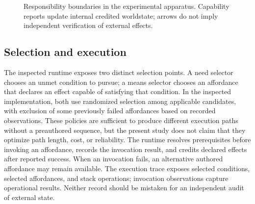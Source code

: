 \documentclass[11pt]{article}
\begin{document}
\begin{figure}[ht]
\centering
{}
\caption{Responsibility boundaries in the experimental apparatus. Capability reports update internal credited worldstate; arrows do not imply independent verification of external effects.}
\label{fig:architecture}
\end{figure}

\subsection{Selection and execution}
The inspected runtime exposes two distinct selection points. A need selector chooses an unmet condition to pursue; a means selector chooses an affordance that declares an effect capable of satisfying that condition. In the inspected implementation, both use randomized selection among applicable candidates, with exclusion of some previously failed affordances based on recorded observations. These policies are sufficient to produce different execution paths without a preauthored sequence, but the present study does not claim that they optimize path length, cost, or reliability. The runtime resolves prerequisites before invoking an affordance, records the invocation result, and credits declared effects after reported success. When an invocation fails, an alternative authored affordance may remain available. The execution trace exposes selected conditions, selected affordances, and stack operations; invocation observations capture operational results. Neither record should be mistaken for an independent audit of external state.
\end{document}
